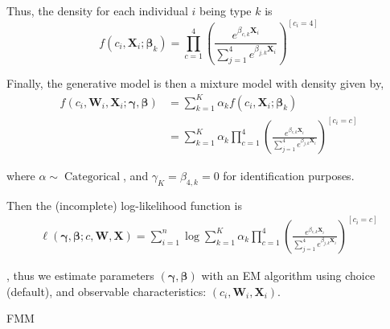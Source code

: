 \documentclass[oneside,11pt]{article}
\begin{document}
Thus, the density for each individual $i$ being type $k$ is
\[f(c_i,\mathbf{X}_i; \bm\beta_{k}) = \prod_{c=1}^4\left(\frac{e^{\beta_{c,k} \mathbf{X}_i}}{\sum_{j=1}^{4} e^{\beta_{j,k}  \mathbf{X}_i}}\right)^{[c_i=4]}\]

Finally, the generative model is then a mixture model with density given by,
\begin{align*}
    f(c_i ,\mathbf{W}_i, \mathbf{X}_i; \bm{\gamma},\bm{\beta}) &= \sum_{k=1}^K \alpha_k f(c_i,\mathbf{X}_i; \bm\beta_{k}) \\
    &= \sum_{k=1}^K \alpha_k \prod_{c=1}^4\left(\frac{e^{\beta_{c,k} \mathbf{X}_i}}{\sum_{j=1}^{4} e^{\beta_{j,k}  \mathbf{X}_i}}\right)^{[c_i=c]} 
\end{align*}



where $\alpha\sim \operatorname{Categorical}$, and $\gamma_{K} = \beta_{4,k}=0$ for identification purposes. 

Then the (incomplete) log-likelihood function is
\begin{align*}
    \ell(\bm{\gamma}, \bm{\beta}; c, \mathbf{W},  \mathbf{X}) = \sum_{i=1}^n \log\sum_{k=1}^K \alpha_k \prod_{c=1}^4\left(\frac{e^{\beta_{c,k} \mathbf{X}_i}}{\sum_{j=1}^{4} e^{\beta_{j,k}  \mathbf{X}_i}}\right)^{[c_i=c]} 
\end{align*}

, thus we estimate parameters $(\bm{\gamma}, \bm{\beta})$ with an EM algorithm using choice (default), and observable characteristics: $(c_i,\mathbf{W}_i,\mathbf{X}_i)$.


\begin{table}[H]
\caption{FMM}
\label{fmm_table}
\begin{center}
\scriptsize{}
\end{center}
 \scriptsize

\end{table}
\end{document}
